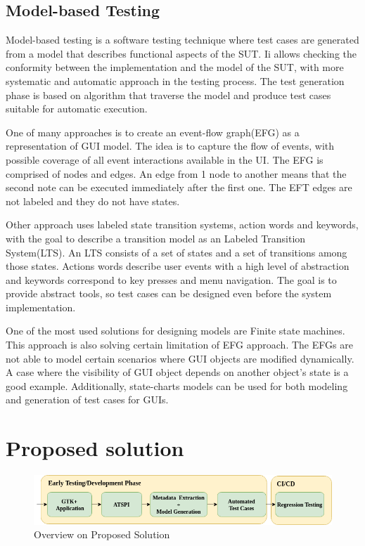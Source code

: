 \section{Model-based Testing}
Model-based testing is a software testing technique where test cases are generated from a model that describes functional aspects of the SUT. Ii allows checking the conformity between the implementation and the model of the SUT, with more systematic and automatic approach in the testing process. The test generation phase is based on algorithm that traverse the model and produce test cases suitable for automatic execution. 

One of many approaches is to create an event-flow graph(EFG) as a representation of GUI model. The idea is to capture the flow of events, with possible coverage of all event interactions available in the UI.  The EFG is comprised of nodes and edges. An edge from 1 node to another means that the second note can be executed immediately after the first one. The EFT edges are not labeled and they do not have states. 

Other approach uses labeled state transition systems, action words and keywords, with the goal to describe a transition model as an Labeled Transition System(LTS). An LTS consists of a set of states and a set of transitions among those states. Actions words describe user events with a high level of abstraction and keywords correspond to key presses and menu navigation. The goal is to provide abstract tools, so test cases can be designed even before the system implementation. 

One of the most used solutions for designing models are Finite state machines. This approach is also solving certain limitation of EFG approach. The EFGs are not able to model certain scenarios where GUI objects are modified dynamically. A case where the visibility of GUI object depends on another object's state is a good example. Additionally, state-charts models can be used for both modeling and generation of test cases for GUIs.
\chapter{Proposed solution}

\begin{figure}[hbt]
	\centering
	\includegraphics[width=1\textwidth]{obrazky-figures/diagram.png}
	\caption{Overview on Proposed Solution}
	\label{Diagram}
\end{figure}

